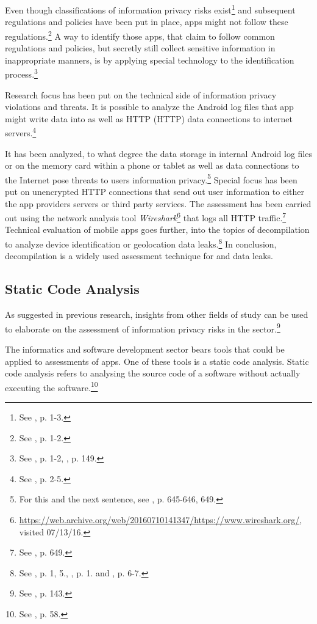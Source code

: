 Even though classifications of information privacy risks exist\footnote{See \cite{Lewis2014}, p. 1-3.} and subsequent regulations and policies have been put in place, \mH apps might not follow these regulations.\footnote{See \cite{Huckvale2015}, p. 1-2.}
A way to identify those apps, that claim to follow common regulations and policies, but secretly still collect sensitive information in inappropriate manners, is by applying special technology to the identification process.\footnote{See \cite{Huckvale2015}, p. 1-2, \cite{Arora2014}, p. 149.}

Research focus has been put on the technical side of information privacy violations and threats. 
It is possible to analyze the Android log files that \mH app might write data into as well as \acl{HTTP} (\acs{HTTP}) data connections to internet servers.\footnote{See \cite{Huckvale2015}, p. 2-5.}

It has been analyzed, to what degree the data storage in internal Android log files or on the memory card within a phone or tablet as well as data connections to the Internet pose threats to users information privacy.\footnote{For this and the next sentence, see \cite{He2014}, p. 645-646, 649.}
Special focus has been put on unencrypted HTTP connections that send out user information to either the app providers servers or third party services.
The assessment has been carried out using the network analysis tool \textit{Wireshark}\footnote{\url{https://web.archive.org/web/20160710141347/https://www.wireshark.org/}, visited 07/13/16.} that logs all HTTP traffic.\footnote{See \cite{He2014}, p. 649.}
Technical evaluation of mobile apps goes further, into the topics of decompilation to analyze device identification or geolocation data leaks.\footnote{See \cite{Mcclurg2012}, p. 1, 5., \cite{Enck2011}, p. 1. and \cite{Mitchell2013}, p. 6-7.}
In conclusion, decompilation is a widely used assessment technique for \ipr and data leaks.

\subsection{Static Code Analysis}

As suggested in previous research, insights from other fields of study can be used to elaborate on the assessment of information privacy risks in the \mH sector.\footnote{See \cite{Arora2014}, p. 143.}

The informatics and software development sector bears tools that could be applied to \ipr assessments of \mH apps.
One of these tools is a static code analysis.
Static code analysis refers to analysing the source code of a software without actually executing the software.\footnote{See \cite{Louridas2006}, p. 58.}

